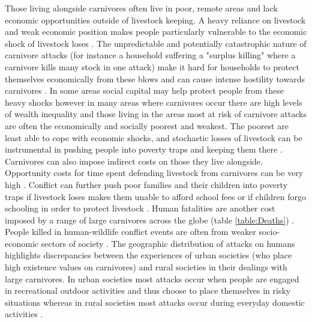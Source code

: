 Those living alongside carnivores often live in poor, remote areas and lack economic opportunities outside of livestock keeping. A heavy reliance on livestock and weak economic position makes people particularly vulnerable to the economic shock of livestock loses \citep{Bagchi2006}. The unpredictable and potentially catastrophic nature of carnivore attacks (for instance a household suffering a "surplus killing" where a carnivore kills many stock in one attack) make it hard for households to protect themselves economically from these blows and can cause intense hostility towards carnivores \citep{Dickman2011,Musiani2005}. In some areas social capital may help protect people from these heavy shocks however in many areas where carnivores occur there are high levels of wealth inequality and those living in the areas most at risk of carnivore attacks are often the economically and socially poorest and weakest. The poorest are least able to cope with economic shocks, and stochastic losses of livestock can be instrumental in pushing people into poverty traps and keeping them there \citep{Lybbert2015}.\\

Carnivores can also impose indirect costs on those they live alongside. Opportunity costs for time spent defending livestock from carnivores can be very high \citep{woodroffe2005people}. Conflict can further push poor families and their children into poverty traps if livestock loses makes them unable to afford school fees or if children forgo schooling in order to protect livestock \citep{Dickman2011}. Human fatalities are another cost imposed by a range of large carnivores across the globe (table \ref{table:Deaths}) \citep{Loe2004a}. People killed in human-wildlife conflict events are often from weaker socio-economic sectors of society \citep{Das2011}. The geographic distribution of attacks on humans highlights discrepancies between the experiences of urban societies (who place high existence values on carnivores) and rural societies in their dealings with large carnivores. In urban societies most attacks occur when people are engaged in recreational outdoor activities and thus choose to place themselves in risky situations whereas in rural societies most attacks occur during everyday domestic activities \citep{Loe2004a}.\\

